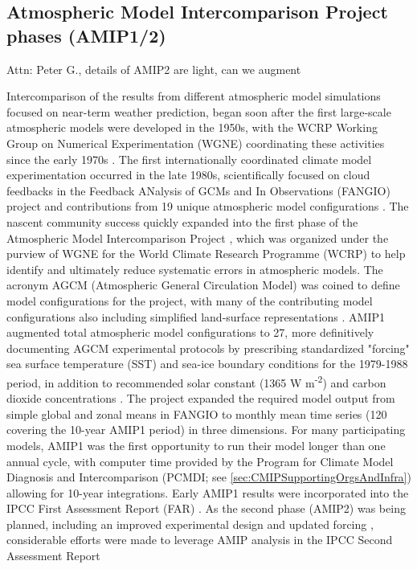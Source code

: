 \documentclass[gmd, preprint]{copernicus}
\newcommand{\mycomment}[1]{}
\def\cred#1{{\color{red}#1}}
\begin{document}
\mycomment{
1955-65: Establishment of Atmospheric General Circulation Modelling
http://pne.people.si.umich.edu/sloan/1955_65.html
Establishment of the IPCC UNEP 70th plenary meeting 6 December 1988
https://documents.un.org/doc/resolution/gen/nr0/530/32/img/nr053032.pdf?OpenElement
}

\subsection{Atmospheric Model Intercomparison Project phases (AMIP1/2)}
\label{sec:amip1And2}
\cred{Attn: Peter G., details of AMIP2 are light, can we augment}

Intercomparison of the results from different atmospheric model simulations focused on near-term weather prediction, began soon after the first large-scale atmospheric models were developed in the 1950s, with the WCRP Working Group on Numerical Experimentation (WGNE) coordinating these activities since the early 1970s \citep{gates_ams_1992}. The first internationally coordinated climate model experimentation occurred in the late 1980s, scientifically focused on cloud feedbacks in the Feedback ANalysis of GCMs and In Observations (FANGIO) project and contributions from 19 unique atmospheric model configurations \citep{cess_methodology_1988, cess_interpretation_1989, cess_intercomparison_1990, cess_first_1991}. The nascent community success quickly expanded into the first phase of the Atmospheric Model Intercomparison Project \citep[AMIP, hereafter referred to as AMIP1;][]{gates_amip_1992}, which was organized under the purview of WGNE for the World Climate Research Programme (WCRP) to help identify and ultimately reduce systematic errors in atmospheric models. The acronym AGCM (Atmospheric General Circulation Model) was coined to define model configurations for the project, with many of the contributing model configurations also including simplified land-surface representations \citep[e.g.,][]{budyko_heat_1961,manabe_climate_1969,vargas_godoy_global_2021}. AMIP1 augmented total atmospheric model configurations to 27, more definitively documenting AGCM experimental protocols by prescribing standardized "forcing" sea surface temperature (SST) and sea-ice boundary conditions for the 1979-1988 period, in addition to recommended solar constant (1365 W m\textsuperscript{-2}) and carbon dioxide concentrations \citep[345 ppm;][]{gates_amip_1991}. The project expanded the required model output from simple global and zonal means in FANGIO to monthly mean time series (120 covering the 10-year AMIP1 period) in three dimensions. For many participating models, AMIP1 was the first opportunity to run their model longer than one annual cycle, with computer time provided by the Program for Climate Model Diagnosis and Intercomparison (PCMDI; see \autoref{sec:CMIPSupportingOrgsAndInfra}) allowing for 10-year integrations. Early AMIP1 results were incorporated into the IPCC First Assessment Report (FAR) \citep{gates_validation_1990}. As the second phase (AMIP2) was being planned, including an improved experimental design and updated forcing \citep{liang_pcmdi_1997, taylor_pcmdi_2000}, considerable efforts were made to leverage AMIP analysis in the IPCC Second Assessment Report 
\end{document}
